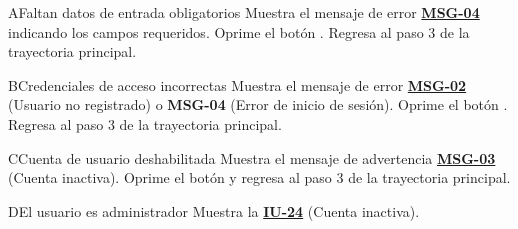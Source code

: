 \begin{UCtrayectoriaA}{A}{Faltan datos de entrada obligatorios}
	\UCpaso Muestra el mensaje de error \hyperlink{mMSG04}{\bf MSG-04} indicando los campos requeridos.
	\UCpaso[\UCactor] Oprime el botón .
	\UCpaso Regresa al paso 3 de la trayectoria principal.
\end{UCtrayectoriaA}

\begin{UCtrayectoriaA}{B}{Credenciales de acceso incorrectas}
	\UCpaso Muestra el mensaje de error \hyperlink{mMSG02}{\bf MSG-02} (Usuario no registrado) o {\bf MSG-04} (Error de inicio de sesión).
	\UCpaso[\UCactor] Oprime el botón .
	\UCpaso Regresa al paso 3 de la trayectoria principal.
\end{UCtrayectoriaA}

\begin{UCtrayectoriaA}{C}{Cuenta de usuario deshabilitada}
	\UCpaso Muestra el mensaje de advertencia \hyperlink{mMSG03}{\bf MSG-03} (Cuenta inactiva).
	\UCpaso[\UCactor] Oprime el botón  y regresa al paso 3 de la trayectoria principal.
\end{UCtrayectoriaA}

\begin{UCtrayectoriaA}{D}{El usuario es administrador}
	\UCpaso Muestra la \hyperlink{IU24}{\bf IU-24} (Cuenta inactiva).
\end{UCtrayectoriaA}
